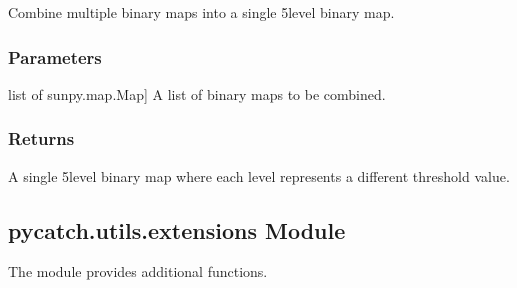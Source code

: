 \documentclass[letterpaper,10pt,english]{sphinxmanual}
\begin{document}
\begin{fulllineitems}
\label{\detokenize{pycatch/utils/ch_mapping:pycatch.utils.ch_mapping.to_5binmap}}
\pysigstartsignatures
{}
\pysigstopsignatures
\sphinxAtStartPar
Combine multiple binary maps into a single 5\sphinxhyphen{}level binary map.


\subsubsection{Parameters}
\label{\detokenize{pycatch/utils/ch_mapping:id27}}\begin{description}
\sphinxlineitem{binmaps}{[}list of sunpy.map.Map{]}
\sphinxAtStartPar
A list of binary maps to be combined.

\end{description}


\subsubsection{Returns}
\label{\detokenize{pycatch/utils/ch_mapping:id28}}\begin{description}
\sphinxAtStartPar
A single 5\sphinxhyphen{}level binary map where each level represents a different threshold value.

\end{description}

\end{fulllineitems}


\sphinxstepscope


\subsection{pycatch.utils.extensions Module}
\label{\detokenize{pycatch/utils/extensions:pycatch-utils-extensions-module}}\label{\detokenize{pycatch/utils/extensions::doc}}
\sphinxAtStartPar
The  module provides additional functions.

\label{\detokenize{pycatch/utils/extensions:module-pycatch.utils.extensions}}
\end{document}
